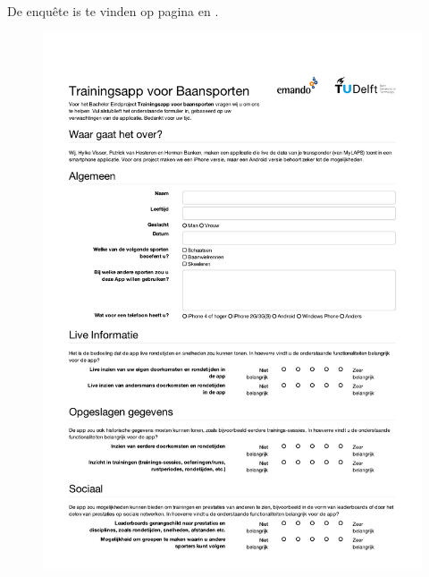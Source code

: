 De enquête is te vinden op pagina \pageref{fig:enquete1} en \pageref{fig:enquete2}.

\begin{figure}[ht]
  \begin{center}
    \includegraphics[width=\textwidth]{style/images/Enquete1}
  \end{center}
  \label{fig:enquete1}
\end{figure}


